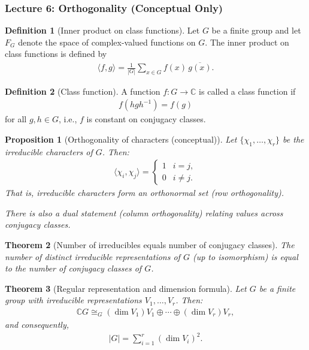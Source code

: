 \documentclass[titlepage]{article}
\theoremstyle{plain}
\newtheorem{theorem}{Theorem}[section]
\newtheorem{proposition}[theorem]{Proposition}
\theoremstyle{definition}
\newtheorem{definition}{Definition}[section]
\theoremstyle{remark}
\theoremstyle{exercise-style}
\numberwithin{equation}{section}
\numberwithin{theorem}{section}
\numberwithin{remark}{section}
\begin{document}
\subsubsection{Lecture 6: Orthogonality (Conceptual Only)}


\begin{definition}[Inner product on class functions]
Let $G$ be a finite group and let $F_G$ denote the space of complex-valued functions on $G$. The inner product on class functions is defined by
\begin{align}
\langle f, g \rangle = \frac{1}{|G|} \sum_{x \in G} f(x)\,\overline{g(x)}.
\end{align}
\end{definition}

\begin{definition}[Class function]
A function $f: G \to \mathbb{C}$ is called a class function if
\begin{align}
f(hgh^{-1}) = f(g)
\end{align}
for all $g,h \in G$, i.e., $f$ is constant on conjugacy classes.
\end{definition}

\begin{proposition}[Orthogonality of characters (conceptual)]
Let $\{\chi_1, \dots, \chi_r\}$ be the irreducible characters of $G$. Then:
\begin{align}
\langle \chi_i, \chi_j \rangle =
\begin{cases}
1 & i = j, \\
0 & i \neq j.
\end{cases}
\end{align}
That is, irreducible characters form an orthonormal set (row orthogonality). 

There is also a dual statement (column orthogonality) relating values across conjugacy classes.
\end{proposition}

\begin{theorem}[Number of irreducibles equals number of conjugacy classes]
The number of distinct irreducible representations of $G$ (up to isomorphism) is equal to the number of conjugacy classes of $G$.
\end{theorem}

\begin{theorem}[Regular representation and dimension formula]
Let $G$ be a finite group with irreducible representations $V_1,\dots,V_r$. Then:
\begin{align}
\mathbb{C}G \cong_G (\dim V_1)V_1 \oplus \cdots \oplus (\dim V_r)V_r,
\end{align}
and consequently,
\begin{align}
|G| = \sum_{i=1}^r (\dim V_i)^2.
\end{align}
\end{theorem}
\end{document}
